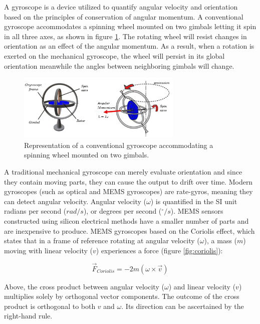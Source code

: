 A gyroscope is a device utilized to quantify angular velocity and orientation based on the principles of conservation of angular momentum. A conventional gyroscope accommodates a spinning wheel mounted on two gimbals letting it spin in all three axes, as shown in figure \ref{fig:gyroscope}. The rotating wheel will resist changes in orientation as an effect of the angular momentum. As a result, when a rotation is exerted on the mechanical gyroscope, the wheel will persist in its global orientation meanwhile the angles between neighboring gimbals will change.

\begin{figure}[!h]
    \centering
    \includegraphics[width=0.7\textwidth]{figures/gyroscope.pdf}
    \caption{Representation of a conventional gyroscope accommodating a spinning wheel mounted on two gimbals.  }
    \label{fig:gyroscope}
\end{figure}

A traditional mechanical gyroscope can merely evaluate orientation and since they contain moving parts, they can cause the output to drift over time. Modern gyroscopes (such as optical and MEMS gyroscopes) are rate-gyros, meaning they can detect angular velocity. Angular velocity ($\omega$) is quantified in the SI unit radians per second ($rad/s$), or degrees per second ($^{\circ}/s$). MEMS sensors constructed using silicon electrical methods have a smaller number of parts and are inexpensive to produce. MEMS gyroscopes based on the Coriolis effect, which states that in a frame of reference rotating at angular velocity ($\omega$), a mass ($m$) moving with linear velocity ($v$) experiences a force (figure \ref{fig:coriolis}):

\begin{equation}
    \overrightarrow{F}_{Coriolis} = -2m(\omega \times \overrightarrow{v} )
\end{equation}

Above, the cross product between angular velocity ($\omega$) and linear velocity ($v$) multiplies solely by orthogonal vector components. The outcome of the cross product is orthogonal to both $v$ and $\omega$. Its direction can be ascertained by the right-hand rule.

